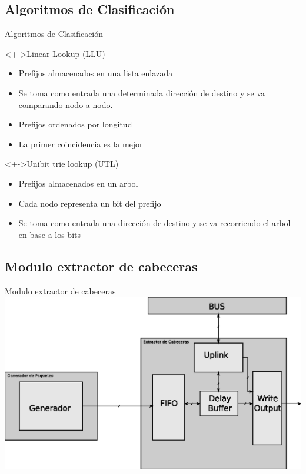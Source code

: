 \documentclass[xcolor=dvipsnames]{beamer}
\begin{document}
\subsection{Algoritmos de Clasificación}
\begin{frame}{Algoritmos de Clasificación}
\begin{block}<+->{Linear Lookup (LLU)}   
    \begin{itemize}
      \scriptsize
     	\item Prefijos almacenados en una lista enlazada
	\item Se toma como entrada una determinada dirección de destino y se va comparando nodo a nodo.
	\item Prefijos ordenados por longitud
	\item La primer coincidencia es la mejor
    \end{itemize}
  \end{block}
  \begin{block}<+->{Unibit trie lookup (UTL)}   
    \begin{itemize}
      \scriptsize
     	\item Prefijos almacenados en un arbol
	\item Cada nodo representa un bit del prefijo
	\item Se toma como entrada una dirección de destino y se va recorriendo el arbol en base a los bits
    \end{itemize}
  \end{block}
\end{frame}

\subsection{Modulo extractor de cabeceras}

\begin{frame}{Modulo extractor de cabeceras}
\center 
\includegraphics[scale=0.60]{figures/modulo.eps}
\end{frame}
\end{document}
